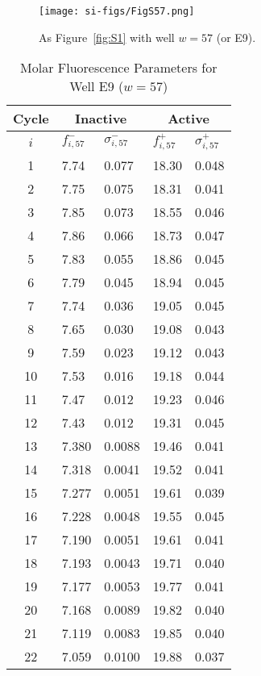                 \begin{figure}
                    \centering
                    \texttt{[image: si-figs/FigS57.png]}
                    \caption{
                        As Figure~\ref{fig:S1} with well $w=57$ (or E9).
                    }
                \end{figure}
                \clearpage
    \begin{table}
        \caption{Molar Fluorescence Parameters for Well E9 ($w=57$)}
        \centering
        \begin{tabular}{c|ll|ll}
            Cycle & \multicolumn{2}{c|}{Inactive} & \multicolumn{2}{c}{Active} \\
            \hline
            $i$ & $f_{i,57}^{-}$ & $\sigma_{i,57}^{-}$ &  $f_{i,57}^{+}$ & $\sigma_{i,57}^{+}$ \\
            \hline
    1 & 7.74 & 0.077 & 18.30 & 0.048 \\
2 & 7.75 & 0.075 & 18.31 & 0.041 \\
3 & 7.85 & 0.073 & 18.55 & 0.046 \\
4 & 7.86 & 0.066 & 18.73 & 0.047 \\
5 & 7.83 & 0.055 & 18.86 & 0.045 \\
6 & 7.79 & 0.045 & 18.94 & 0.045 \\
7 & 7.74 & 0.036 & 19.05 & 0.045 \\
8 & 7.65 & 0.030 & 19.08 & 0.043 \\
9 & 7.59 & 0.023 & 19.12 & 0.043 \\
10 & 7.53 & 0.016 & 19.18 & 0.044 \\
11 & 7.47 & 0.012 & 19.23 & 0.046 \\
12 & 7.43 & 0.012 & 19.31 & 0.045 \\
13 & 7.380 & 0.0088 & 19.46 & 0.041 \\
14 & 7.318 & 0.0041 & 19.52 & 0.041 \\
15 & 7.277 & 0.0051 & 19.61 & 0.039 \\
16 & 7.228 & 0.0048 & 19.55 & 0.045 \\
17 & 7.190 & 0.0051 & 19.61 & 0.041 \\
18 & 7.193 & 0.0043 & 19.71 & 0.040 \\
19 & 7.177 & 0.0053 & 19.77 & 0.041 \\
20 & 7.168 & 0.0089 & 19.82 & 0.040 \\
21 & 7.119 & 0.0083 & 19.85 & 0.040 \\
22 & 7.059 & 0.0100 & 19.88 & 0.037 \\

\end{tabular}
\end{table}
